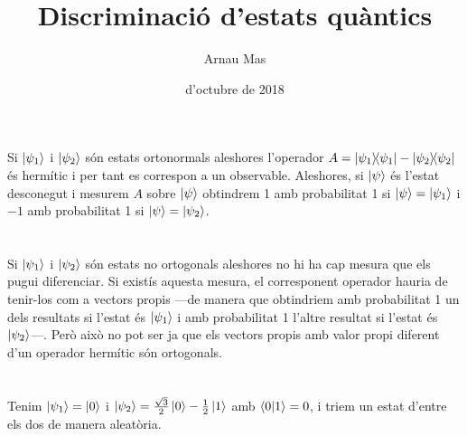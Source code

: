 \documentclass[12pt]{article}
\title{\sffamily {\bfseries Entrega 3:} Discriminació d'estats quàntics}
\author{\sffamily Arnau Mas}
\date{\sffamily 31 d'octubre de 2018}
\numberwithin{table}{section}
\numberwithin{figure}{section}
\numberwithin{equation}{section}
\newcommand{\proj}[1]{\ketbra{#1}{#1}}
\begin{document}
\maketitle
\section{}
Si \( \ket{\psi_1} \) i \( \ket{\psi_2} \) són estats ortonormals aleshores l'operador \( A = \proj{\psi_1} - \proj{\psi_2} \) és hermític i per tant es correspon a un observable. Aleshores, si \( \ket{\psi} \) és l'estat desconegut i mesurem \( A \) sobre \( \ket{\psi} \) obtindrem 1 amb probabilitat 1 si \( \ket{\psi} = \ket{\psi_1} \) i \( -1 \) amb probabilitat 1 si \( \ket{\psi} = \ket{\psi_2} \).

\section{}
Si \( \ket{\psi_1} \) i \( \ket{\psi_2} \) són estats no ortogonals aleshores no hi ha cap mesura que els pugui diferenciar. Si existís aquesta mesura, el corresponent operador hauria de tenir-los com a vectors propis ---de manera que obtindriem amb probabilitat 1 un dels resultats si l'estat és \( \ket{\psi_1} \) i amb probabilitat 1 l'altre resultat si l'estat és \( \ket{\psi_2} \)---. Però això no pot ser ja que els vectors propis amb valor propi diferent d'un operador hermític són ortogonals. 

\section{}
Tenim \( \ket{\psi_1} = \ket{0} \) i \( \ket{\psi_2} = \frac{\sqrt{3}}{2}\ket{0} - \frac{1}{2}\ket{1} \) amb \( \braket{0}{1} = 0 \), i triem un estat d'entre els dos de manera aleatòria. 
\end{document}
